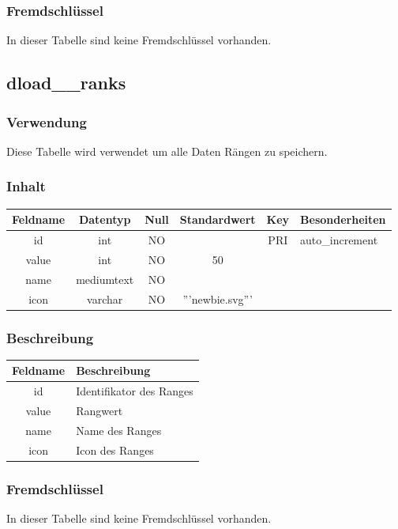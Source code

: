 \subsubsection{Fremdschlüssel}
In dieser Tabelle sind keine Fremdschlüssel vorhanden.
\subsection{dload\_\_ranks}
\subsubsection{Verwendung} Diese Tabelle wird verwendet um alle Daten Rängen zu speichern.
\subsubsection{Inhalt}
\begin{table}[H]
	\begin{tabular}{|c|c|c|c|c|p{3.5cm}|}
		\hline
		\textbf{Feldname} & \textbf{Datentyp} & \textbf{Null} & \textbf{Standardwert} & \textbf{Key}   & \textbf{Besonderheiten} \\ \hline
		id & int & NO &  & PRI & auto\_increment \\ \hline
		value & int & NO & 50 &  & \\ \hline
		name & mediumtext & NO &  &  & \\ \hline
		icon & varchar & NO & '''newbie.svg''' &  & \\ \hline
	\end{tabular}
\end{table}
\subsubsection{Beschreibung}
\begin{table}[H]
	\begin{tabular}{|c|p{12cm}|}
		\hline
		\textbf{Feldname} & \textbf{Beschreibung}\\ \hline
		id & Identifikator des Ranges \\ \hline
		value & Rangwert \\ \hline
		name & Name des Ranges \\ \hline
		icon & Icon des Ranges \\ \hline
	\end{tabular}
\end{table}
\subsubsection{Fremdschlüssel}
In dieser Tabelle sind keine Fremdschlüssel vorhanden.
